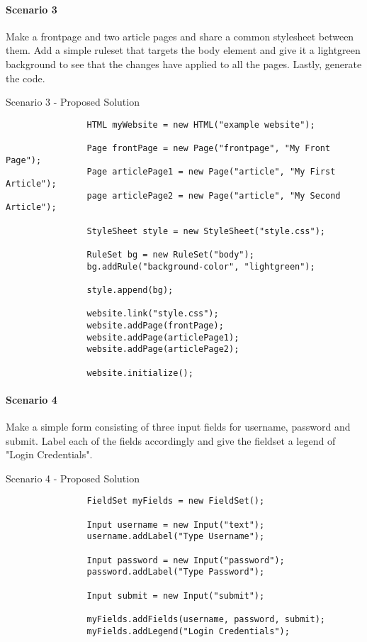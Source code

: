 \documentclass[12pt]{article}
\begin{document}
        \paragraph{Scenario 3}
        Make a frontpage and two article pages and share a common stylesheet between them. Add a simple ruleset that targets the body element and give it a lightgreen background to see that the changes have applied to all the pages. Lastly, generate the code.

        \begin{shaded}
            Scenario 3 - Proposed Solution
            \begin{lstlisting}
                HTML myWebsite = new HTML("example website");
                
                Page frontPage = new Page("frontpage", "My Front Page");
                Page articlePage1 = new Page("article", "My First Article");
                page articlePage2 = new Page("article", "My Second Article");

                StyleSheet style = new StyleSheet("style.css");

                RuleSet bg = new RuleSet("body");
                bg.addRule("background-color", "lightgreen");

                style.append(bg);

                website.link("style.css");
                website.addPage(frontPage);
                website.addPage(articlePage1);
                website.addPage(articlePage2);

                website.initialize();
            \end{lstlisting}
        \end{shaded}

        \paragraph{Scenario 4}
        Make a simple form consisting of three input fields for username, password and submit. Label each of the fields accordingly and give the fieldset a legend of "Login Credentials".

        \begin{shaded}
            Scenario 4 - Proposed Solution
            \begin{lstlisting}
                FieldSet myFields = new FieldSet();

                Input username = new Input("text");
                username.addLabel("Type Username");
                
                Input password = new Input("password");
                password.addLabel("Type Password");
                
                Input submit = new Input("submit");

                myFields.addFields(username, password, submit);
                myFields.addLegend("Login Credentials");
            \end{lstlisting}
        \end{shaded}
\end{document}
